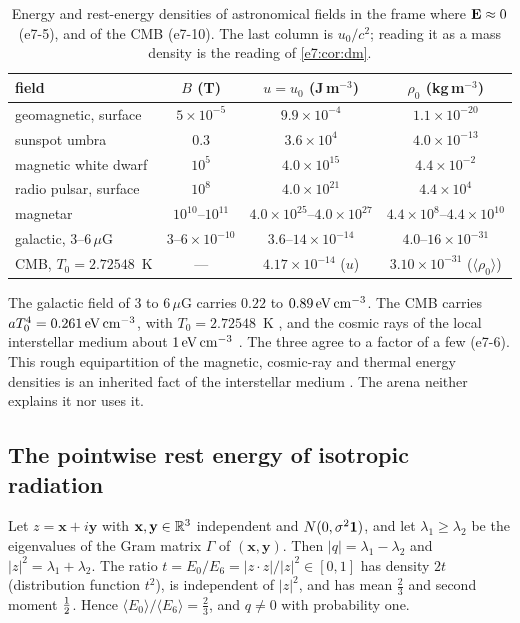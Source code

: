 \begin{table}[ht]
\centering
\small
\begin{tabular}{@{}lccc@{}}
\toprule
field & $B$ (T) & $u=u_0$ (J\,m$^{-3}$) & $\rho_0$ (kg\,m$^{-3}$)\\
\midrule
geomagnetic, surface & $5\times10^{-5}$ & $9.9\times10^{-4}$ & $1.1\times10^{-20}$\\
sunspot umbra & $0.3$ & $3.6\times10^{4}$ & $4.0\times10^{-13}$\\
magnetic white dwarf & $10^{5}$ & $4.0\times10^{15}$ & $4.4\times10^{-2}$\\
radio pulsar, surface & $10^{8}$ & $4.0\times10^{21}$ & $4.4\times10^{4}$\\
magnetar & $10^{10}$--$10^{11}$ & $4.0\times10^{25}$--$4.0\times10^{27}$ & $4.4\times10^{8}$--$4.4\times10^{10}$\\
galactic, $3$--$6\,\mu$G & $3$--$6\times10^{-10}$ & $3.6$--$14\times10^{-14}$ & $4.0$--$16\times10^{-31}$\\
\midrule
CMB, $T_0=2.72548$~K & --- & $4.17\times10^{-14}$ ($u$) & $3.10\times10^{-31}$ ($\langle\rho_0\rangle$)\\
\bottomrule
\end{tabular}
\caption{Energy and rest-energy densities of astronomical fields in the frame where $\mathbf E\approx0$ (e7-5), and of the CMB (e7-10). The last
column is $u_0/c^2$; reading it as a mass density is the reading of \cref{e7:cor:dm}.}
\label{e7:tab:fields}
\end{table}

The galactic field of $3$ to $6\,\mu$G carries $0.22$ to $0.89\,{\rm eV\,cm^{-3}}$. The CMB carries $aT_0^4=0.261\,{\rm eV\,cm^{-3}}$, with
$T_0=2.72548$~K \cite{Fixsen09}, and the cosmic rays of the local interstellar medium about $1\,{\rm eV\,cm^{-3}}$ \cite{Ferriere01,Draine11}. The three agree to a
factor of a few (e7-6). This rough equipartition of the magnetic, cosmic-ray and thermal energy densities is an inherited fact of the interstellar
medium \cite{Ferriere01}. The arena neither explains it nor uses it.

\subsection{The pointwise rest energy of isotropic radiation}
\label{e7:sec:cmb}

\begin{proposition}
\label{e7:prop:gauss}
Let $z=\mathbf x+i\mathbf y$ with $\mathbf x,\mathbf y\in\mathbb{R}^3$ independent and $N(0,\sigma^2\mathbf 1)$, and let $\lambda_1\ge\lambda_2$ be the
eigenvalues of the Gram matrix $\Gamma$ of $(\mathbf x,\mathbf y)$. Then $|q|=\lambda_1-\lambda_2$ and $|z|^2=\lambda_1+\lambda_2$. The ratio
$t=E_0/E_6=|z\cdot z|/|z|^2\in[0,1]$ has density $2t$ (distribution function $t^2$), is independent of $|z|^2$, and has mean $\tfrac23$ and
second moment $\tfrac12$. Hence $\langle E_0\rangle/\langle E_6\rangle=\tfrac23$, and $q\neq0$ with probability one.
\end{proposition}

